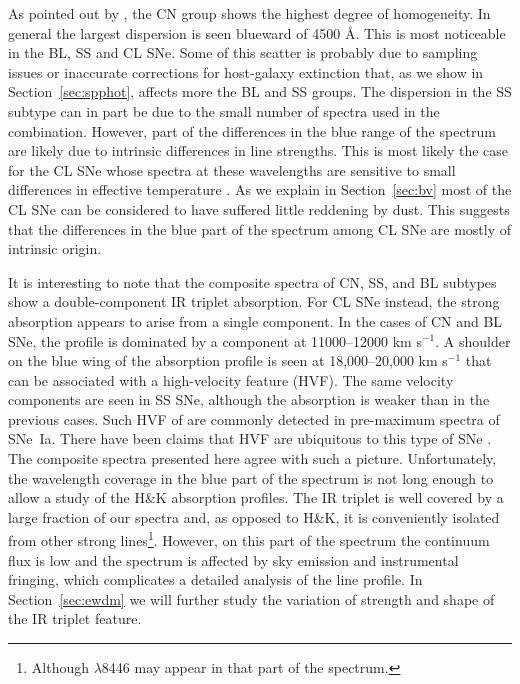 \documentclass[apj]{emulateapj-rtx4}
\newcommand{\sneia}{SNe~Ia}
\begin{document}
As pointed out by \citet{blondin12}, the CN group shows the highest
degree of homogeneity. In general 
the largest dispersion is seen blueward of 4500 \AA. This is most
noticeable in the BL, SS and CL SNe. Some of this scatter is
probably due to sampling issues or inaccurate corrections for host-galaxy
extinction that, as we show in Section~\ref{sec:spphot}, affects more the
BL and SS groups. The dispersion in the SS subtype can in part be
due to the small number of spectra used in the combination. However,
part of the differences in the blue range of the
spectrum are likely due to intrinsic differences in line strengths.
This is most likely the case for the CL SNe whose spectra at these
wavelengths are sensitive to small differences in effective
temperature \citep{nugent95}. As we explain in
Section~\ref{sec:bv} most of the CL SNe can be considered to have
suffered little reddening by dust. This suggests that the differences
in the blue part of the spectrum among CL SNe are mostly of intrinsic
origin. 

It is interesting to note that the composite spectra of CN, SS, and BL
subtypes show a double-component  IR triplet
absorption. For CL SNe instead, the strong absorption appears to arise from a
single component. In the cases of CN and BL SNe, the profile is
dominated by a component at 11000--12000 km s$^{-1}$. A shoulder on
the blue wing of the absorption profile is seen at 18,000--20,000 km
s$^{-1}$ that can be associated with a high-velocity feature (HVF).
The same velocity components are seen in SS SNe, although the
absorption is weaker than in the previous cases. Such HVF of
 are commonly detected in pre-maximum spectra of \sneia.
There have been claims that HVF are ubiquitous to this type of SNe
\citep{mazzali05}. The composite spectra presented here agree with
such a picture. Unfortunately, the wavelength coverage in the blue part
of the spectrum is not long enough to allow a study of the 
H\&K absorption profiles. The  IR triplet is well covered
by a large fraction of our spectra and, as opposed to 
H\&K, it is conveniently isolated from other strong lines\footnote{Although
 $\lambda$8446 may appear in that part of the
spectrum.}. However, on this part of the spectrum the continuum flux
is low and the spectrum is affected by sky emission and instrumental
fringing, which complicates a detailed analysis of the line profile.   
In Section~\ref{sec:ewdm} we will further study the variation of strength
and shape of the  IR triplet feature. 
\end{document}
